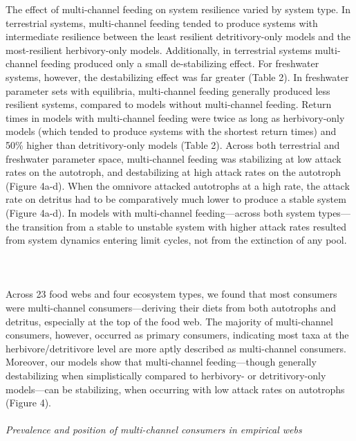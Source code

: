 \documentclass[12pt,a4paper,oneside]{article}
\begin{document}
\newline
\indent The effect of multi-channel feeding on system resilience varied by system type. In terrestrial systems, multi-channel feeding tended to produce systems with
intermediate resilience between the least resilient detritivory-only
models and the most-resilient herbivory-only models. Additionally, in terrestrial
systems multi-channel feeding produced only a small
de-stabilizing effect. For freshwater systems, however, the
destabilizing effect was far greater (Table 2). In freshwater parameter sets with equilibria, 
multi-channel feeding generally produced less resilient systems, compared to models without multi-channel feeding. Return times in models with multi-channel feeding were twice as long as herbivory-only models (which tended to produce systems with the shortest return times) and 50\% higher than detritivory-only models (Table 2). 
\newline
\indent Across both terrestrial and freshwater parameter space, multi-channel feeding was
stabilizing at low attack rates on the autotroph, and destabilizing at high attack rates on the autotroph (Figure 4a-d). When the omnivore
attacked autotrophs at a high rate, the attack rate on
detritus had to be comparatively much lower to produce a stable system
(Figure 4a-d). In models with multi-channel feeding---across both system types---the transition from a stable to unstable system with higher attack rates resulted from system dynamics entering limit cycles, not from the extinction of any pool. 
\\
\\
\\
\\
\indent Across 23 food webs and four ecosystem types, we found that most
consumers were multi-channel consumers---deriving their diets from both
autotrophs and detritus, especially at the top of the food
web. The majority of multi-channel consumers, however, occurred as primary
consumers, indicating most taxa at the herbivore/detritivore level
are more aptly described as multi-channel consumers. Moreover, our models show that
multi-channel feeding---though generally destabilizing when simplistically compared to herbivory- or detritivory-only models---can be stabilizing, when occurring with low attack
rates on autotrophs (Figure 4). 
\\
\\
\noindent \emph{Prevalence and position of multi-channel consumers in empirical webs}\\
\end{document}
